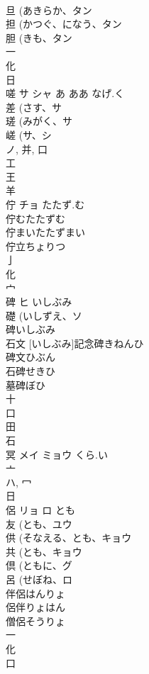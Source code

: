 \documentclass[8pt]{extreport}
\begin{document}
\begin{CJK}{UTF8}{min}
\\	旦 (あきらか、タン 
\\	担 (かつぐ、になう、タン 
\\	胆 (きも、タン 
\\	一 
\\	化 
\\	日 
\\	嗟	サ シャ	あ ああ なげ.く	
\\	差 (さす、サ 
\\	瑳 (みがく、サ 
\\	嵯 (サ、シ 
\\	ノ, 并, 口 
\\	工 
\\	王 
\\	羊 
\\	佇	チョ	たたず.む	
\\	佇むたたずむ
\\	佇まいたたずまい
\\	佇立ちょりつ
\\	亅 
\\	化 
\\	宀 
\\	碑	ヒ	いしぶみ	
\\	礎 (いしずえ、ソ 
\\	碑いしぶみ
\\	石文 [いしぶみ]記念碑きねんひ
\\	碑文ひぶん
\\	石碑せきひ
\\	墓碑ぼひ
\\	十 
\\	口 
\\	田 
\\	石 
\\	冥	メイ ミョウ	くら.い	
\\	亠 
\\	ハ, 冖 
\\	日 
\\	侶	リョ ロ	とも	
\\	友 (とも、ユウ 
\\	供 (そなえる、とも、キョウ 
\\	共 (とも、キョウ 
\\	倶 (ともに、グ 
\\	呂 (せぼね、ロ 
\\	伴侶はんりょ
\\	侶伴りょはん
\\	僧侶そうりょ
\\	一 
\\	化 
\\	口 

\end{CJK}
\end{document}
